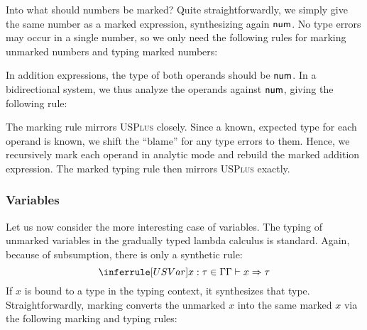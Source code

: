 Into what should numbers be marked? Quite straightforwardly, we simply give the same number as a
marked expression, synthesizing again $\TNum$. No type errors may occur in a single number, so we
only need the following rules for marking unmarked numbers and typing marked numbers:
%
\begin{mathpar}

\end{mathpar}

In addition expressions, the type of both operands should be $\TNum$. In a bidirectional system, we
thus analyze the operands against $\TNum$, giving the following rule:
%
\begin{mathpar}
\end{mathpar}

The marking rule mirrors \textsc{USPlus} closely. Since a known, expected type for each operand is
known, we shift the ``blame'' for any type errors to them. Hence, we recursively mark each operand
in analytic mode and rebuild the marked addition expression. The marked typing rule then mirrors
\textsc{USPlus} exactly.
%
\begin{mathpar}

\end{mathpar}

\subsubsection{Variables}
\label{sec:calculus-variables}

Let us now consider the more interesting case of variables. The typing of unmarked variables in the
gradually typed lambda calculus is standard. Again, because of subsumption, there is only a
synthetic rule:
\[%
  \judgment{
    \inCtx{\ctx}{x}{\TMV}
  }{
    \ctxSynType{\ctx}{x}{\TMV}
  }{USVar}
\]%
If $x$ is bound to a type in the typing context, it synthesizes that type. Straightforwardly,
marking converts the unmarked $x$ into the same marked $x$ via the following marking and typing
rules:
%
\begin{mathpar}

\end{mathpar}

